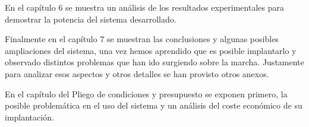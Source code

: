 En el capítulo 6 se muestra un análisis de los resultados experimentales para demostrar la potencia del sistema desarrollado.
 
Finalmente en el capítulo 7 se muestran las conclusiones y algunas posibles ampliaciones del sistema, una vez hemos aprendido que es posible implantarlo y observado distintos problemas que han ido surgiendo sobre la marcha. Justamente para analizar esos aspectos y otros detalles se han provisto otros anexos.

En el capítulo del Pliego de condiciones y presupuesto se exponen primero, la posible problemática en el uso del sistema y un análisis del coste económico de su implantación.